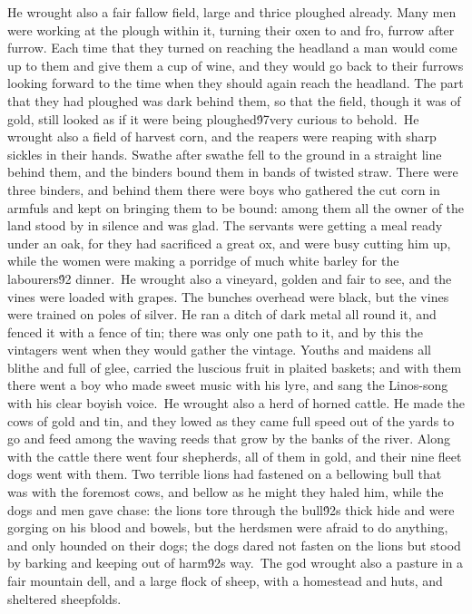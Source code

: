 {He wrought also a fair fallow field, large and thrice ploughed already. Many men were working at the plough within it, turning their oxen to and fro, furrow after furrow. Each time that they turned on reaching the headland a man would come up to them and give them a cup of wine, and they would go back to their furrows looking forward to the time when they should again reach the headland. The part that they had ploughed was dark behind them, so that the field, though it was of gold, still looked as if it were being ploughed\'97very curious to behold.\
He wrought also a field of harvest corn, and the reapers were reaping with sharp sickles in their hands. Swathe after swathe fell to the ground in a straight line behind them, and the binders bound them in bands of twisted straw. There were three binders, and behind them there were boys who gathered the cut corn in armfuls and kept on bringing them to be bound: among them all the owner of the land stood by in silence and was glad. The servants were getting a meal ready under an oak, for they had sacrificed a great ox, and were busy cutting him up, while the women were making a porridge of much white barley for the labourers\'92 dinner.\
He wrought also a vineyard, golden and fair to see, and the vines were loaded with grapes. The bunches overhead were black, but the vines were trained on poles of silver. He ran a ditch of dark metal all round it, and fenced it with a fence of tin; there was only one path to it, and by this the vintagers went when they would gather the vintage. Youths and maidens all blithe and full of glee, carried the luscious fruit in plaited baskets; and with them there went a boy who made sweet music with his lyre, and sang the Linos-song with his clear boyish voice.\
He wrought also a herd of horned cattle. He made the cows of gold and tin, and they lowed as they came full speed out of the yards to go and feed among the waving reeds that grow by the banks of the river. Along with the cattle there went four shepherds, all of them in gold, and their nine fleet dogs went with them. Two terrible lions had fastened on a bellowing bull that was with the foremost cows, and bellow as he might they haled him, while the dogs and men gave chase: the lions tore through the bull\'92s thick hide and were gorging on his blood and bowels, but the herdsmen were afraid to do anything, and only hounded on their dogs; the dogs dared not fasten on the lions but stood by barking and keeping out of harm\'92s way.\
The god wrought also a pasture in a fair mountain dell, and a large flock of sheep, with a homestead and huts, and sheltered sheepfolds.\
}
